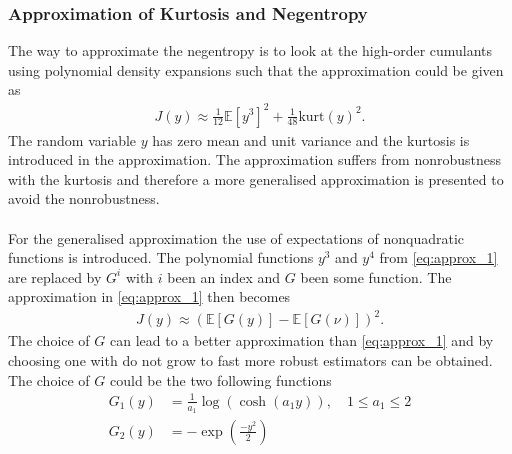 \subsubsection{Approximation of Kurtosis and Negentropy}
The way to approximate the negentropy is to look at the high-order cumulants using polynomial density expansions such that the approximation could be given as
\begin{align}\label{eq:approx_1}
J(y) \approx \frac{1}{12} \mathbb{E}[y^3]^2 + \frac{1}{48} \text{kurt}(y)^2.
\end{align}
The random variable $y$ has zero mean and unit variance and the kurtosis is introduced in the approximation. The approximation suffers from nonrobustness with the kurtosis and therefore a more generalised approximation is presented to avoid the nonrobustness.
\\ \\
For the generalised approximation the use of expectations of nonquadratic functions is introduced. The polynomial functions $y^3$ and $y^4$ from \eqref{eq:approx_1} are replaced by $G^i$ with $i$ been an index and $G$ been some function. The approximation in \eqref{eq:approx_1} then becomes
\begin{align*}
J(y) \approx (\mathbb{E}[G(y)] - \mathbb{E}[G(\nu)])^2.
\end{align*}
The choice of $G$ can lead to a better approximation than \eqref{eq:approx_1} and by choosing one with do not grow to fast more robust estimators can be obtained. The choice of $G$ could be the two following functions
\begin{align*}
G_1 (y) &= \frac{1}{a_1} \log (\cosh(a_1 y)), \quad 1 \leq a_1 \leq 2 \\
G_2 (y) &= -\exp \left( \frac{-y^2}{2} \right)
\end{align*}


